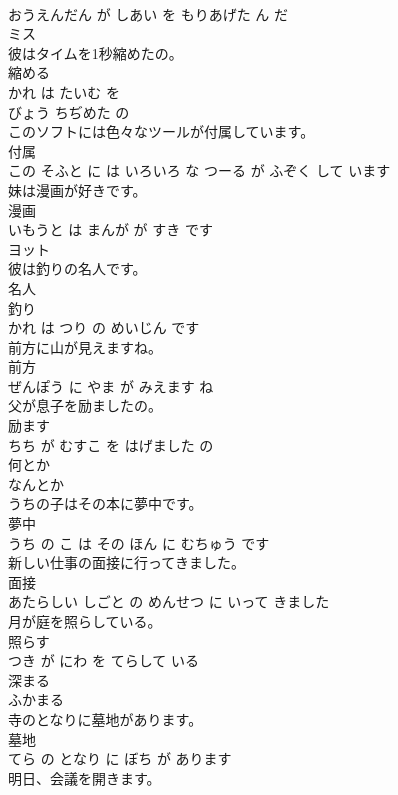 \documentclass[8pt]{extreport}
\begin{document}
\begin{CJK}{UTF8}{min}
\\	おうえんだん が しあい を もりあげた ん だ			
\\	ミス	
\\	彼はタイムを1秒縮めたの。	
\\	縮める 
\\	かれ は たいむ を 
\\	びょう ちぢめた の			
\\	このソフトには色々なツールが付属しています。	
\\	付属 
\\	この そふと に は いろいろ な つーる が ふぞく して います			
\\	妹は漫画が好きです。	
\\	漫画 
\\	いもうと は まんが が すき です			
\\	ヨット	
\\	彼は釣りの名人です。	
\\	名人 
\\	釣り 
\\	かれ は つり の めいじん です			
\\	前方に山が見えますね。	
\\	前方 
\\	ぜんぽう に やま が みえます ね			
\\	父が息子を励ましたの。	
\\	励ます 
\\	ちち が むすこ を はげました の			
\\	何とか	
\\	なんとか		
\\	うちの子はその本に夢中です。	
\\	夢中 
\\	うち の こ は その ほん に むちゅう です			
\\	新しい仕事の面接に行ってきました。	
\\	面接 
\\	あたらしい しごと の めんせつ に いって きました			
\\	月が庭を照らしている。	
\\	照らす 
\\	つき が にわ を てらして いる			
\\	深まる	
\\	ふかまる		
\\	寺のとなりに墓地があります。	
\\	墓地 
\\	てら の となり に ぼち が あります			
\\	明日、会議を開きます。	

\end{CJK}
\end{document}
